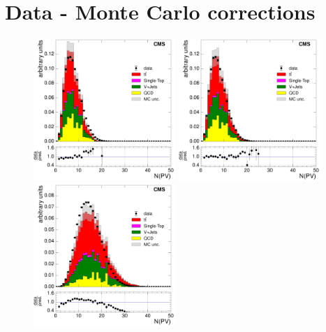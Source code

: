 \section{Data - Monte Carlo corrections}
\label{as:data_monte_carlo_corrections}
\begin{figure}[H]
    \centering
      \includegraphics[width=0.48\textwidth]{Chapters/04_Analysis/04b_XSections/images/control_plots/before_fit/7TeV/EPlusJets_nVertex__with_ratio}\hfill
      \includegraphics[width=0.48\textwidth]{Chapters/04_Analysis/04b_XSections/images/control_plots/before_fit/7TeV/EPlusJets_nVertex_reweighted__with_ratio}\\
      \includegraphics[width=0.48\textwidth]{Chapters/04_Analysis/04b_XSections/images/control_plots/before_fit/8TeV/EPlusJets_nVertex__with_ratio}\hfill

\end{figure}

